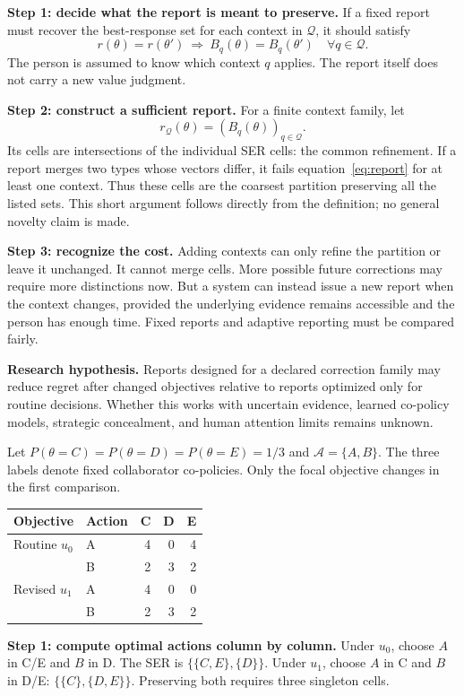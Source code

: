 \documentclass[11pt,letterpaper]{article}
\begin{document}
\textbf{Step 1: decide what the report is meant to preserve.} If a fixed report must recover the best-response set for each context in $\mathcal Q$, it should satisfy
\begin{equation}\label{eq:report}
 r(\theta)=r(\theta')\ \Longrightarrow\
 B_q(\theta)=B_q(\theta')\quad\forall q\in\mathcal Q.
\end{equation}
The person is assumed to know which context $q$ applies. The report itself does not carry a new value judgment.

\textbf{Step 2: construct a sufficient report.} For a finite context family, let
\begin{equation}
 r_{\mathcal Q}(\theta)=(B_q(\theta))_{q\in\mathcal Q}.
\end{equation}
Its cells are intersections of the individual SER cells: the common refinement. If a report merges two types whose vectors differ, it fails equation~\eqref{eq:report} for at least one context. Thus these cells are the coarsest partition preserving all the listed sets. This short argument follows directly from the definition; no general novelty claim is made.

\textbf{Step 3: recognize the cost.} Adding contexts can only refine the partition or leave it unchanged. It cannot merge cells. More possible future corrections may require more distinctions now. But a system can instead issue a new report when the context changes, provided the underlying evidence remains accessible and the person has enough time. Fixed reports and adaptive reporting must be compared fairly.

\textbf{Research hypothesis.} Reports designed for a declared correction family may reduce regret after changed objectives relative to reports optimized only for routine decisions. Whether this works with uncertain evidence, learned co-policy models, strategic concealment, and human attention limits remains unknown.

\status{checked illustration} Let $P(\theta=C)=P(\theta=D)=P(\theta=E)=1/3$ and $\mathcal A=\{A,B\}$. The three labels denote fixed collaborator co-policies. Only the focal objective changes in the first comparison.
\begin{center}\begin{tabular}{llrrr}\toprule
Objective & Action & C & D & E\\\midrule
Routine $u_0$ & A & 4&0&4\\
& B &2&3&2\\\midrule
Revised $u_1$ & A &4&0&0\\
& B &2&3&2\\\bottomrule\end{tabular}\end{center}
\textbf{Step 1: compute optimal actions column by column.} Under $u_0$, choose $A$ in C/E and $B$ in D. The SER is $\{\{C,E\},\{D\}\}$. Under $u_1$, choose $A$ in C and $B$ in D/E: $\{\{C\},\{D,E\}\}$. Preserving both requires three singleton cells.
\end{document}
